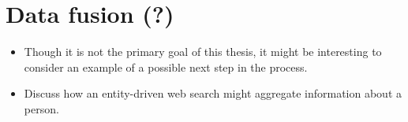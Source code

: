 

\section{Data fusion (?)}
\begin{itemize}
    \item Though it is not the primary goal of this thesis, it might be interesting to consider an example of a possible next step in the process.
    \item Discuss how an entity-driven web search might aggregate information about a person.
\end{itemize}